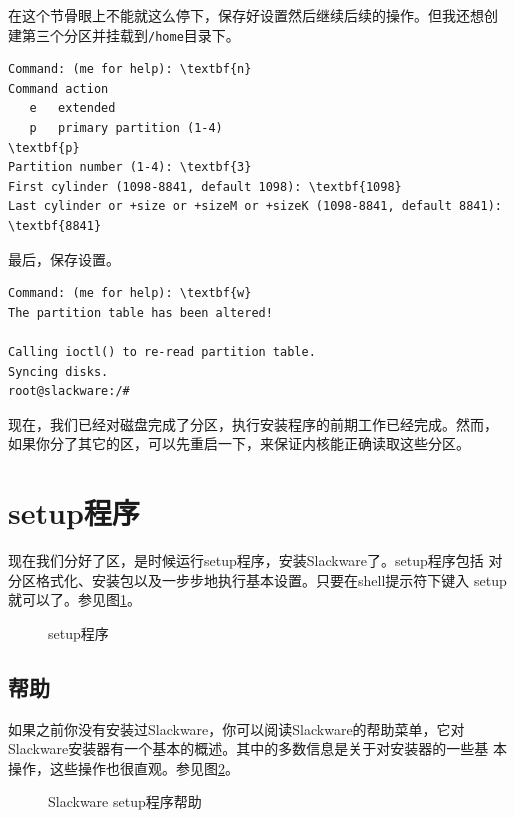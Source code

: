 在这个节骨眼上不能就这么停下，保存好设置然后继续后续的操作。但我还想创
建第三个分区并挂载到\texttt{/home}目录下。
\begin{Verbatim}[frame=single,commandchars=\\\{\}]
Command: (me for help): \textbf{n}
Command action
   e   extended
   p   primary partition (1-4)
\textbf{p}
Partition number (1-4): \textbf{3}
First cylinder (1098-8841, default 1098): \textbf{1098}
Last cylinder or +size or +sizeM or +sizeK (1098-8841, default 8841): \textbf{8841}
\end{Verbatim}
最后，保存设置。
\begin{Verbatim}[frame=single,commandchars=\\\{\}]
Command: (me for help): \textbf{w}
The partition table has been altered!

Calling ioctl() to re-read partition table.
Syncing disks.
root@slackware:/# 
\end{Verbatim}
现在，我们已经对磁盘完成了分区，执行安装程序的前期工作已经完成。然而，
如果你分了其它的区，可以先重启一下，来保证内核能正确读取这些分区。

\section{setup程序}
\label{sec:installation:setupProgram}

现在我们分好了区，是时候运行setup程序，安装Slackware了。setup程序包括
对分区格式化、安装包以及一步步地执行基本设置。只要在shell提示符下键入
setup就可以了。参见图\ref{fig:setup-program}。
\begin{figure}[htpb]
  \centering
  \caption{setup程序}
  \label{fig:setup-program}
\end{figure}

\subsection{帮助}
\label{sec:installation:setup:setupHelp}

如果之前你没有安装过Slackware，你可以阅读Slackware的帮助菜单，它对
Slackware安装器有一个基本的概述。其中的多数信息是关于对安装器的一些基
本操作，这些操作也很直观。参见图\ref{fig:setup-help}。
\begin{figure}[htpb]
  \centering
  \caption{Slackware setup程序帮助}
  \label{fig:setup-help}
\end{figure}

